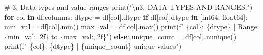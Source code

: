 \documentclass[
  letterpaper,
  DIV=11,
  numbers=noendperiod]{scrartcl}
\newenvironment{Shaded}{\begin{snugshade}}{\end{snugshade}}
\newcommand{\BuiltInTok}[1]{\textcolor[rgb]{0.00,0.23,0.31}{#1}}
\newcommand{\CharTok}[1]{\textcolor[rgb]{0.13,0.47,0.30}{#1}}
\newcommand{\CommentTok}[1]{\textcolor[rgb]{0.37,0.37,0.37}{#1}}
\newcommand{\ControlFlowTok}[1]{\textcolor[rgb]{0.00,0.23,0.31}{\textbf{#1}}}
\newcommand{\KeywordTok}[1]{\textcolor[rgb]{0.00,0.23,0.31}{\textbf{#1}}}
\newcommand{\NormalTok}[1]{\textcolor[rgb]{0.00,0.23,0.31}{#1}}
\newcommand{\OperatorTok}[1]{\textcolor[rgb]{0.37,0.37,0.37}{#1}}
\newcommand{\SpecialCharTok}[1]{\textcolor[rgb]{0.37,0.37,0.37}{#1}}
\newcommand{\SpecialStringTok}[1]{\textcolor[rgb]{0.13,0.47,0.30}{#1}}
\newcommand{\StringTok}[1]{\textcolor[rgb]{0.13,0.47,0.30}{#1}}
\begin{document}
\begin{Shaded}
\begin{Highlighting}[]
\CommentTok{\# 3. Data types and value ranges}
\BuiltInTok{print}\NormalTok{(}\StringTok{"}\CharTok{\textbackslash{}n}\StringTok{3. DATA TYPES AND RANGES:"}\NormalTok{)}
\ControlFlowTok{for}\NormalTok{ col }\KeywordTok{in}\NormalTok{ df.columns:}
\NormalTok{    dtype }\OperatorTok{=}\NormalTok{ df[col].dtype}
    \ControlFlowTok{if}\NormalTok{ df[col].dtype }\KeywordTok{in}\NormalTok{ [}\StringTok{\textquotesingle{}int64\textquotesingle{}}\NormalTok{, }\StringTok{\textquotesingle{}float64\textquotesingle{}}\NormalTok{]:}
\NormalTok{        min\_val }\OperatorTok{=}\NormalTok{ df[col].}\BuiltInTok{min}\NormalTok{()}
\NormalTok{        max\_val }\OperatorTok{=}\NormalTok{ df[col].}\BuiltInTok{max}\NormalTok{()}
        \BuiltInTok{print}\NormalTok{(}\SpecialStringTok{f"   }\SpecialCharTok{\{}\NormalTok{col}\SpecialCharTok{\}}\SpecialStringTok{: }\SpecialCharTok{\{}\NormalTok{dtype}\SpecialCharTok{\}}\SpecialStringTok{ | Range: }\SpecialCharTok{\{}\NormalTok{min\_val}\SpecialCharTok{:,.2f\}}\SpecialStringTok{ to }\SpecialCharTok{\{}\NormalTok{max\_val}\SpecialCharTok{:,.2f\}}\SpecialStringTok{"}\NormalTok{)}
    \ControlFlowTok{else}\NormalTok{:}
\NormalTok{        unique\_count }\OperatorTok{=}\NormalTok{ df[col].nunique()}
        \BuiltInTok{print}\NormalTok{(}\SpecialStringTok{f"   }\SpecialCharTok{\{}\NormalTok{col}\SpecialCharTok{\}}\SpecialStringTok{: }\SpecialCharTok{\{}\NormalTok{dtype}\SpecialCharTok{\}}\SpecialStringTok{ | }\SpecialCharTok{\{}\NormalTok{unique\_count}\SpecialCharTok{\}}\SpecialStringTok{ unique values"}\NormalTok{)}


\end{Highlighting}
\end{Shaded}
\end{document}
